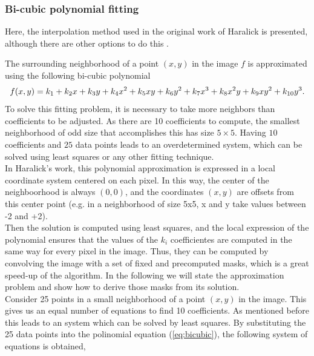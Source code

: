 \documentclass{ipol}
\numberwithin{equation}{section}
\numberwithin{table}{section}
\begin{document}
{%

\subsubsection{Bi-cubic polynomial fitting}
\label{sec:bicubic}

Here, the interpolation method used in the original work of Haralick is presented, although there are other options to do this \cite{getreuer}. 

The surrounding neighborhood of a point $(x,y)$ in the image $f$ is approximated using the following bi-cubic polynomial
\begin{equation}
	\label{eq:bicubic}
	f(x,y) = k_1 + k_2x + k_3y + k_4x^2 + k_5xy + k_6y^2 + k_7x^3 + k_8x^2y + k_9xy^2 + k_{10}y^3. \\
\end{equation}
To solve this fitting problem, it is necessary to take more neighbors than coefficients to be adjusted. As there are 10 coefficients to compute, the smallest neighborhood of odd size that accomplishes this has size $5\times5$. Having $10$ coefficients and $25$ data 
points leads to an overdetermined system, which can be solved using least squares or any other fitting technique.\\

\myn{\label{second_derivative:haralick:statement}} In Haralick's work, this polynomial approximation is expressed in a local coordinate system centered on each pixel. In this way, the center of the neighboorhood is always $(0,0)$, and the coordinates $(x, y)$ are offsets from this center point (e.g. in a neighborhood of size 5x5, x and y take values between -2 and +2).\\
Then the solution is computed using least squares, and the local expression of the polynomial ensures that the values of the $k_i$ coefficientes are computed in the same way for every pixel in the image. Thus, they can be computed by convolving the image with a set of fixed and precomputed masks, which is a great speed-up of the algorithm. In the following we will state the approximation problem and show how to derive those masks from its solution.\\

Consider 25 points in a small neighborhood of a point $(x,y)$ in the image. This gives us an equal number of equations 
to find 10 coefficients. As mentioned before this leads to an  system which can be solved by least squares. 
By substituting the 25 data points into the polinomial equation (\ref{eq:bicubic}), the following system of 
equations is obtained,

}
\end{document}
